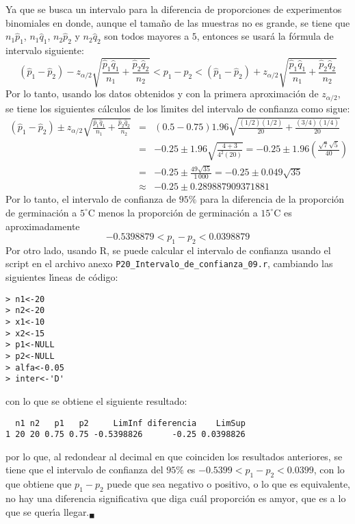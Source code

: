 \begin{solucion}
 Ya que se busca un intervalo para la diferencia de proporciones de experimentos binomiales en donde, aunque el tama\~no de las muestras no es grande, se tiene que $n_1\hat{p}_1$, $n_1\hat{q}_1$, $n_2\hat{p}_2$ y $n_2\hat{q}_2$ son todos mayores a $5$, entonces se usar\'a la f\'ormula de intervalo siguiente:
 \begin{equation*}
  \left( \hat{p}_1 - \hat{p}_2 \right) - z_{\alpha/2}\sqrt{\frac{\hat{p}_1\hat{q}_1}{n_1} + \frac{\hat{p}_2\hat{q}_2}{n_2}} < p_1 - p_2 < \left( \hat{p}_1 - \hat{p}_2 \right) + z_{\alpha/2}\sqrt{\frac{\hat{p}_1\hat{q}_1}{n_1} + \frac{\hat{p}_2\hat{q}_2}{n_2}}
 \end{equation*}
 Por lo tanto, usando los datos obtenidos y con la primera aproximaci\'on de $z_{\alpha/2}$, se tiene los siguientes c\'alculos de los l\'{\i}mites del intervalo de confianza como sigue:
 \begin{eqnarray*}
  \left( \hat{p}_1 - \hat{p}_2 \right) \pm z_{\alpha/2}\sqrt{\frac{\hat{p}_1\hat{q}_1}{n_1} + \frac{\hat{p}_2\hat{q}_2}{n_2}} & = & \left( 0.5 - 0.75 \right) 1.96\sqrt{\frac{(1/2)(1/2)}{20} + \frac{(3/4)(1/4)}{20}} \\
  & = & -0.25 \pm 1.96\sqrt{\frac{4+3}{4^2(20)}} = -0.25 \pm 1.96 \left( \frac{\sqrt{7}\sqrt{5}}{40} \right) \\
  & = & -0.25 \pm \frac{49\sqrt{35}}{1\,000} = -0.25 \pm 0.049\sqrt{35} \\
  & \approx & -0.25 \pm 0.289887909371881
 \end{eqnarray*}
 Por lo tanto, el intervalo de confianza de $95\%$ para la diferencia de la proporci\'on de germinaci\'on a $5^{\circ}$C menos la proporci\'on de germinaci\'on a $15^{\circ}$C es aproximadamente
 \begin{equation*}
  -0.5398879 < p_1 - p_2 < 0.0398879
 \end{equation*}
 Por otro lado, usando R, se puede calcular el intervalo de confianza usando el script en el archivo anexo \texttt{P20\_Intervalo\_de\_confianza\_09.r}, cambiando las siguientes l\'{\i}neas de c\'odigo:
 \begin{verbatim}
> n1<-20
> n2<-20
> x1<-10
> x2<-15
> p1<-NULL
> p2<-NULL
> alfa<-0.05
> inter<-'D'
 \end{verbatim}
 \vspace{-0.5cm}
 con lo que se obtiene el siguiente resultado:
 \begin{verbatim}
  n1 n2   p1   p2     LimInf diferencia    LimSup
1 20 20 0.75 0.75 -0.5398826      -0.25 0.0398826
 \end{verbatim}
 \vspace{-0.5cm}
 por lo que, al redondear al decimal en que coinciden los resultados anteriores, se tiene que el intervalo de confianza del $95\%$ es $-0.5399 < p_1 - p_2 < 0.0399$, con lo que obtiene que $p_1 - p_2$ puede que sea negativo o positivo, o lo que es equivalente, no hay una diferencia significativa que diga cu\'al proporci\'on es amyor, que es a lo que se quer\'{\i}a llegar.${}_{\blacksquare}$
\end{solucion}
